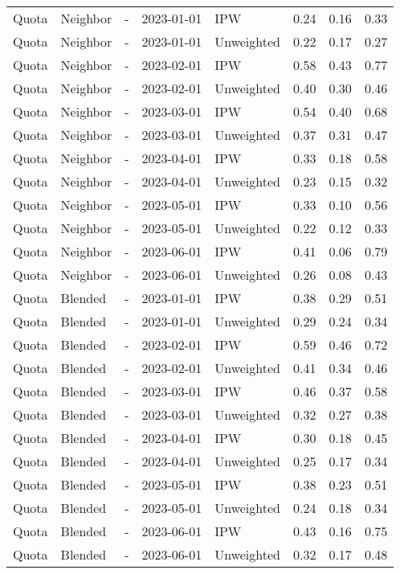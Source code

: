 \begin{longtable}[t]{lllllrrr}
Quota & Neighbor & - & 2023-01-01 & IPW & 0.24 & 0.16 & 0.33\\
Quota & Neighbor & - & 2023-01-01 & Unweighted & 0.22 & 0.17 & 0.27\\
\addlinespace
Quota & Neighbor & - & 2023-02-01 & IPW & 0.58 & 0.43 & 0.77\\
Quota & Neighbor & - & 2023-02-01 & Unweighted & 0.40 & 0.30 & 0.46\\
Quota & Neighbor & - & 2023-03-01 & IPW & 0.54 & 0.40 & 0.68\\
Quota & Neighbor & - & 2023-03-01 & Unweighted & 0.37 & 0.31 & 0.47\\
Quota & Neighbor & - & 2023-04-01 & IPW & 0.33 & 0.18 & 0.58\\
\addlinespace
Quota & Neighbor & - & 2023-04-01 & Unweighted & 0.23 & 0.15 & 0.32\\
Quota & Neighbor & - & 2023-05-01 & IPW & 0.33 & 0.10 & 0.56\\
Quota & Neighbor & - & 2023-05-01 & Unweighted & 0.22 & 0.12 & 0.33\\
Quota & Neighbor & - & 2023-06-01 & IPW & 0.41 & 0.06 & 0.79\\
Quota & Neighbor & - & 2023-06-01 & Unweighted & 0.26 & 0.08 & 0.43\\
\addlinespace
Quota & Blended & - & 2023-01-01 & IPW & 0.38 & 0.29 & 0.51\\
Quota & Blended & - & 2023-01-01 & Unweighted & 0.29 & 0.24 & 0.34\\
Quota & Blended & - & 2023-02-01 & IPW & 0.59 & 0.46 & 0.72\\
Quota & Blended & - & 2023-02-01 & Unweighted & 0.41 & 0.34 & 0.46\\
Quota & Blended & - & 2023-03-01 & IPW & 0.46 & 0.37 & 0.58\\
\addlinespace
Quota & Blended & - & 2023-03-01 & Unweighted & 0.32 & 0.27 & 0.38\\
Quota & Blended & - & 2023-04-01 & IPW & 0.30 & 0.18 & 0.45\\
Quota & Blended & - & 2023-04-01 & Unweighted & 0.25 & 0.17 & 0.34\\
Quota & Blended & - & 2023-05-01 & IPW & 0.38 & 0.23 & 0.51\\
Quota & Blended & - & 2023-05-01 & Unweighted & 0.24 & 0.18 & 0.34\\
\addlinespace
Quota & Blended & - & 2023-06-01 & IPW & 0.43 & 0.16 & 0.75\\
Quota & Blended & - & 2023-06-01 & Unweighted & 0.32 & 0.17 & 0.48\\*
\end{longtable}
